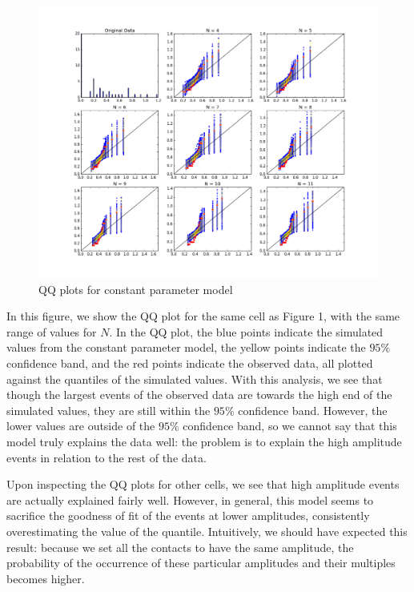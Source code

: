 \documentclass{article}
\begin{document}
\begin{figure}[h]
  \centering
  \caption{QQ plots for constant parameter model}
  \includegraphics[width=1.0\textwidth]{10sept2015f-4-qq}
\end{figure}

In this figure, we show the QQ plot for the same cell as Figure 1, with the same range of values for $N$. In the QQ plot, the blue points indicate the simulated values from the constant parameter model, the yellow points indicate the $95\%$ confidence band, and the red points indicate the observed data, all plotted against the quantiles of the simulated values. With this analysis, we see that though the largest events of the observed data are towards the high end of the simulated values, they are still within the $95\%$ confidence band. However, the lower values are outside of the $95\%$ confidence band, so we cannot say that this model truly explains the data well: the problem is to explain the high amplitude events in relation to the rest of the data.

Upon inspecting the QQ plots for other cells, we see that high amplitude events are actually explained fairly well. However, in general, this model seems to sacrifice the goodness of fit of the events at lower amplitudes, consistently overestimating the value of the quantile. Intuitively, we should have expected this result: because we set all the contacts to have the same amplitude, the probability of the occurrence of these particular amplitudes and their multiples becomes higher.
\end{document}
